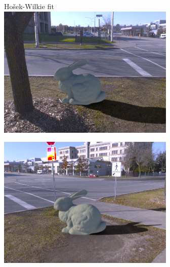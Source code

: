 \begin{minipage}{\linewidth}
\begin{multicols}{4}












\vfill\null
\columnbreak

Hošek-Wilkie fit\\

\includegraphics[width=\mywidth]{AG8A2875_Panorama_hdr-corrected_003.jpg}

\includegraphics[width=\mywidth]{AG8A2875_Panorama_hdr-corrected_005.jpg}


\end{multicols}
\end{minipage}
